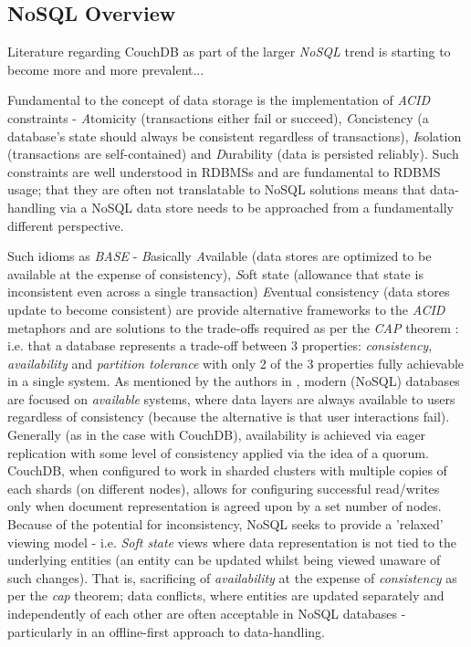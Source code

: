 \subsection{NoSQL Overview}
Literature regarding CouchDB as part of the larger \textit{NoSQL} trend is starting to become more and more prevalent...

Fundamental to the concept of data storage is the implementation of \textit{ACID} constraints - \textit{A}tomicity (transactions either fail or succeed), \textit{C}oncistency (a database's state should always be consistent regardless of transactions), \textit{I}solation (transactions are self-contained) and \textit{D}urability (data is persisted reliably). Such constraints are well understood in RDBMSs and are fundamental to RDBMS usage; that they are often not translatable to NoSQL solutions means that data-handling via a NoSQL data store needs to be approached from a fundamentally different perspective.

Such idioms as \textit{BASE} - \textit{B}asically \textit{A}vailable (data stores are optimized to be available at the expense of consistency), \textit{S}oft state (allowance that state is inconsistent even across a single transaction) \textit{E}ventual consistency (data stores update to become consistent) are provide alternative frameworks to the \textit{ACID} metaphors and are solutions to the trade-offs required as per the \textit{CAP} theorem \cite{GANESHCHANDRA201513}: i.e. that a database represents a trade-off between 3 properties: \textit{consistency}, \textit{availability} and \textit{partition tolerance} with only 2 of the 3 properties fully achievable in a single system. As mentioned by the authors in \cite{GANESHCHANDRA201513}, modern (NoSQL) databases are focused on \textit{available} systems, where data layers are always available to users regardless of consistency (because the alternative is that user interactions fail). Generally (as in the case with CouchDB), availability is achieved via eager replication with some level of consistency applied via the idea of a quorum. CouchDB, when configured to work in sharded clusters with multiple copies of each shards (on different nodes), allows for configuring successful read/writes only when document representation is agreed upon by a set number of nodes. Because of the potential for inconsistency, NoSQL seeks to provide a 'relaxed' viewing model - i.e. \textit{Soft state} views where data representation is not tied to the underlying entities (an entity can be updated whilst being viewed unaware of such changes). That is, sacrificing of \textit{availability} at the expense of \textit{consistency} as per the \textit{cap} theorem; data conflicts, where entities are updated separately and independently of each other are often acceptable in NoSQL databases - particularly in an offline-first approach to data-handling.

